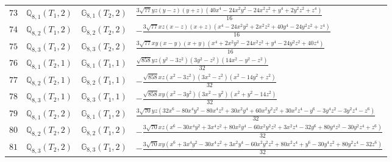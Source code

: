 \documentclass[fleqn,8pt,landscape]{jsarticle}
\begin{document}
\begin{table}[ht!]
\begin{center}
\begin{tabular}{cccl}
$ 73 $ & $ \mathbb{Q}_{8,1}(T_{1},2) $ & $ \mathbb{G}_{8,1}(T_{2},2) $ & $ \frac{3 \sqrt{77} y z \left(y - z\right) \left(y + z\right) \left(40 x^{4} - 24 x^{2} y^{2} - 24 x^{2} z^{2} + y^{4} + 2 y^{2} z^{2} + z^{4}\right)}{16} $ \\
$ 74 $ & $ \mathbb{Q}_{8,2}(T_{1},2) $ & $ \mathbb{G}_{8,2}(T_{2},2) $ & $ - \frac{3 \sqrt{77} x z \left(x - z\right) \left(x + z\right) \left(x^{4} - 24 x^{2} y^{2} + 2 x^{2} z^{2} + 40 y^{4} - 24 y^{2} z^{2} + z^{4}\right)}{16} $ \\
$ 75 $ & $ \mathbb{Q}_{8,3}(T_{1},2) $ & $ \mathbb{G}_{8,3}(T_{2},2) $ & $ \frac{3 \sqrt{77} x y \left(x - y\right) \left(x + y\right) \left(x^{4} + 2 x^{2} y^{2} - 24 x^{2} z^{2} + y^{4} - 24 y^{2} z^{2} + 40 z^{4}\right)}{16} $ \\
$ 76 $ & $ \mathbb{Q}_{8,1}(T_{2},1) $ & $ \mathbb{G}_{8,1}(T_{1},1) $ & $ \frac{\sqrt{858} y z \left(y^{2} - 3 z^{2}\right) \left(3 y^{2} - z^{2}\right) \left(14 x^{2} - y^{2} - z^{2}\right)}{32} $ \\
$ 77 $ & $ \mathbb{Q}_{8,2}(T_{2},1) $ & $ \mathbb{G}_{8,2}(T_{1},1) $ & $ - \frac{\sqrt{858} x z \left(x^{2} - 3 z^{2}\right) \left(3 x^{2} - z^{2}\right) \left(x^{2} - 14 y^{2} + z^{2}\right)}{32} $ \\
$ 78 $ & $ \mathbb{Q}_{8,3}(T_{2},1) $ & $ \mathbb{G}_{8,3}(T_{1},1) $ & $ - \frac{\sqrt{858} x y \left(x^{2} - 3 y^{2}\right) \left(3 x^{2} - y^{2}\right) \left(x^{2} + y^{2} - 14 z^{2}\right)}{32} $ \\
$ 79 $ & $ \mathbb{Q}_{8,1}(T_{2},2) $ & $ \mathbb{G}_{8,1}(T_{1},2) $ & $ \frac{3 \sqrt{70} y z \left(32 x^{6} - 80 x^{4} y^{2} - 80 x^{4} z^{2} + 30 x^{2} y^{4} + 60 x^{2} y^{2} z^{2} + 30 x^{2} z^{4} - y^{6} - 3 y^{4} z^{2} - 3 y^{2} z^{4} - z^{6}\right)}{32} $ \\
$ 80 $ & $ \mathbb{Q}_{8,2}(T_{2},2) $ & $ \mathbb{G}_{8,2}(T_{1},2) $ & $ - \frac{3 \sqrt{70} x z \left(x^{6} - 30 x^{4} y^{2} + 3 x^{4} z^{2} + 80 x^{2} y^{4} - 60 x^{2} y^{2} z^{2} + 3 x^{2} z^{4} - 32 y^{6} + 80 y^{4} z^{2} - 30 y^{2} z^{4} + z^{6}\right)}{32} $ \\
$ 81 $ & $ \mathbb{Q}_{8,3}(T_{2},2) $ & $ \mathbb{G}_{8,3}(T_{1},2) $ & $ - \frac{3 \sqrt{70} x y \left(x^{6} + 3 x^{4} y^{2} - 30 x^{4} z^{2} + 3 x^{2} y^{4} - 60 x^{2} y^{2} z^{2} + 80 x^{2} z^{4} + y^{6} - 30 y^{4} z^{2} + 80 y^{2} z^{4} - 32 z^{6}\right)}{32} $ \\
 \hline \hline
\end{tabular}
\end{center}
\end{table}
\end{document}
